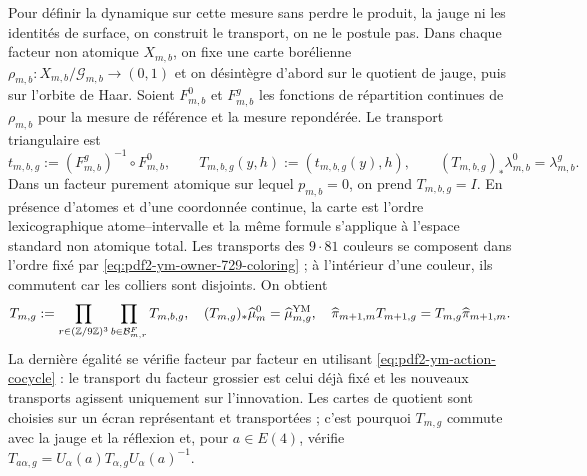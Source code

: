 Pour définir la dynamique sur cette mesure sans perdre le produit, la jauge ni les
identités de surface, on construit le transport, on ne le postule pas. Dans chaque
facteur non atomique $X_{m,b}$, on fixe une carte borélienne
$\rho_{m,b}:X_{m,b}/\mathcal G_{m,b}\to(0,1)$ et on désintègre d’abord sur le
quotient de jauge, puis sur l’orbite de Haar. Soient $F_{m,b}^0$ et
$F_{m,b}^g$ les fonctions de répartition continues de $\rho_{m,b}$ pour la
mesure de référence et la mesure repondérée. Le transport triangulaire est
\begin{equation}\label{eq:pdf2-ym-gibbs-transport-factor}
 t_{m,b,g}:=(F_{m,b}^g)^{-1}\circ F_{m,b}^0,
 \qquad
 T_{m,b,g}(y,h):=(t_{m,b,g}(y),h),
 \qquad
 (T_{m,b,g})_*\lambda_{m,b}^0=\lambda_{m,b}^g.
\end{equation}
Dans un facteur purement atomique sur lequel $p_{m,b}=0$, on prend $T_{m,b,g}=I$. En présence d'atomes et d'une coordonnée continue, la carte est l'ordre lexicographique atome--intervalle et la même formule s'applique à l'espace standard non atomique total. Les transports des $9\cdot81$ couleurs se composent dans l'ordre fixé par \eqref{eq:pdf2-ym-owner-729-coloring} ; à l'intérieur d'une couleur, ils commutent car les colliers sont disjoints. On obtient
\begin{equation}\label{eq:pdf2-ym-gibbs-transport-global}
 T_{m,g}:=\prod_{r\in(\mathbb Z/9\mathbb Z)^3}
           \prod_{b\in\mathcal B_{m,r}^{F}}T_{m,b,g},
 \quad
 (T_{m,g})_*\widehat\mu_m^0=\widehat\mu_{m,g}^{\rm YM},
 \quad
 \widehat\pi_{m+1,m}T_{m+1,g}=T_{m,g}\widehat\pi_{m+1,m}.
\end{equation}
La dernière égalité se vérifie facteur par facteur en utilisant
\eqref{eq:pdf2-ym-action-cocycle} : le transport du facteur grossier est celui déjà fixé et
les nouveaux transports agissent uniquement sur l’innovation. Les cartes de quotient sont
choisies sur un écran représentant et transportées ; c’est pourquoi $T_{m,g}$ commute avec
la jauge et la réflexion et, pour $a\in E(4)$, vérifie
$T_{a\alpha,g}=U_\alpha(a)T_{\alpha,g}U_\alpha(a)^{-1}$.

